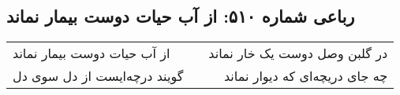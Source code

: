 \begin{center}
\section*{رباعی شماره ۵۱۰: از آب حیات دوست بیمار نماند}
\label{sec:0510}
\begin{longtable}{l p{0.5cm} r}
از آب حیات دوست بیمار نماند
&&
در گلبن وصل دوست یک خار نماند
\\
گویند درچه‌ایست از دل سوی دل
&&
چه جای دریچه‌ای که دیوار نماند
\\
\end{longtable}
\end{center}
